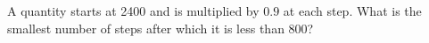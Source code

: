 A quantity starts at 2400 and is multiplied by $0.9$ at each step. What is the smallest number of steps after which it is less than 800?
